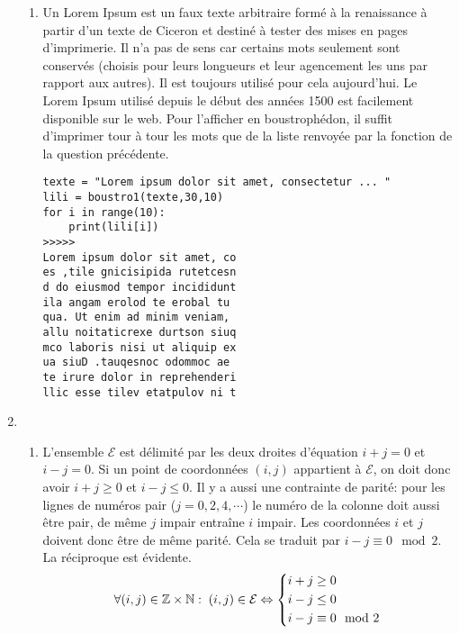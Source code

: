 \begin{enumerate}
\begin{enumerate}
\item Un Lorem Ipsum est un faux texte arbitraire formé à la renaissance à partir d'un texte de Ciceron et destiné à tester des mises en pages d'imprimerie. Il n'a pas de sens car certains mots seulement sont conservés (choisis pour leurs longueurs et leur agencement les uns par rapport aux autres). Il est toujours utilisé pour cela aujourd'hui. Le Lorem Ipsum utilisé depuis le début des années 1500 est facilement disponible sur le web. Pour l'afficher en boustrophédon, il suffit d'imprimer tour à tour les mots que de la liste renvoyée par la fonction de la question précédente.
\begin{verbatim}
texte = "Lorem ipsum dolor sit amet, consectetur ... "
lili = boustro1(texte,30,10)
for i in range(10):
    print(lili[i])
>>>>>
Lorem ipsum dolor sit amet, co
es ,tile gnicisipida rutetcesn
d do eiusmod tempor incididunt
ila angam erolod te erobal tu 
qua. Ut enim ad minim veniam, 
allu noitaticrexe durtson siuq
mco laboris nisi ut aliquip ex
ua siuD .tauqesnoc odommoc ae 
te irure dolor in reprehenderi
llic esse tilev etatpulov ni t
\end{verbatim}
\end{enumerate}

\item
\begin{enumerate}
\item L'ensemble $\mathcal{E}$ est délimité par les deux droites d'équation $i+j=0$ et $i-j=0$. Si un point de coordonnées $(i,j)$ appartient à $\mathcal{E}$, on doit donc avoir $i+j \geq 0$ et $i-j \leq 0$. Il y a aussi une contrainte de parité: pour les lignes de numéros pair ($j=0, 2, 4, \cdots$) le numéro de la colonne doit aussi être pair, de même $j$ impair entraîne $i$ impair. Les coordonnées $i$ et $j$ doivent donc être de même parité. Cela se traduit par $i-j \equiv 0 \mod 2$. La réciproque est évidente.
  \begin{displaymath}
    \forall(i,j)\in \mathbb{Z}\times \mathbb{N}:\;(i,j)\in\mathcal{E} \Leftrightarrow 
    \left\lbrace 
    \begin{aligned}
      &i+j\geq 0 \\ &i-j \leq 0 \\ &i-j \equiv 0 \mod 2
    \end{aligned}
    \right. 
  \end{displaymath}


\end{enumerate}
\end{enumerate}
